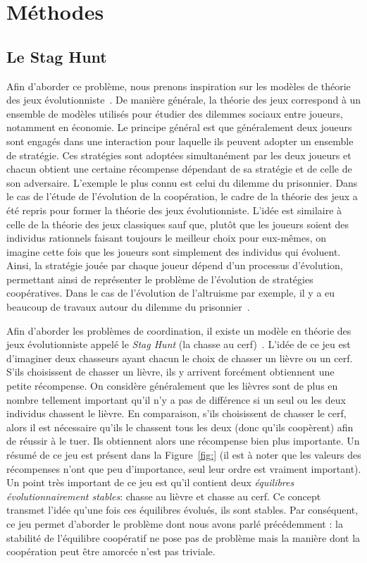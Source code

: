 \section{Méthodes}

	\subsection{Le Stag Hunt}

		Afin d'aborder ce problème, nous prenons inspiration sur les modèles de théorie des jeux évolutionniste~\parencite{MaynardSmith1973}. De manière générale, la théorie des jeux correspond à un ensemble de modèles utilisés pour étudier des dilemmes sociaux entre joueurs, notamment en économie. Le principe général est que généralement deux joueurs sont engagés dans une interaction pour laquelle ils peuvent adopter un ensemble de stratégie. Ces stratégies sont adoptées simultanément par les deux joueurs et chacun obtient une certaine récompense dépendant de sa stratégie et de celle de son adversaire. L'exemple le plus connu est celui du dilemme du prisonnier. Dans le cas de l'étude de l'évolution de la coopération, le cadre de la théorie des jeux a été repris pour former la théorie des jeux évolutionniste. L'idée est similaire à celle de la théorie des jeux classiques sauf que, plutôt que les joueurs soient des individus rationnels faisant toujours le meilleur choix pour eux-mêmes, on imagine cette fois que les joueurs sont simplement des individus qui évoluent. Ainsi, la stratégie jouée par chaque joueur dépend d'un processus d'évolution, permettant ainsi de représenter le problème de l'évolution de stratégies coopératives. Dans le cas de l'évolution de l'altruisme par exemple, il y a eu beaucoup de travaux autour du dilemme du prisonnier~\parencite{Axelrod1984}.

		Afin d'aborder les problèmes de coordination, il existe un modèle en théorie des jeux évolutionniste appelé le \emph{Stag Hunt} (la chasse au cerf)~\parencite{Skyrms2004}. L'idée de ce jeu est d'imaginer deux chasseurs ayant chacun le choix de chasser un lièvre ou un cerf. S'ils choisissent de chasser un lièvre, ils y arrivent forcément obtiennent une petite récompense. On considère généralement que les lièvres sont de plus en nombre tellement important qu'il n'y a pas de différence si un seul ou les deux individus chassent le lièvre. En comparaison, s'ils choisissent de chasser le cerf, alors il est nécessaire qu'ils le chassent tous les deux (donc qu'ils coopèrent) afin de réussir à le tuer. Ils obtiennent alors une récompense bien plus importante. Un résumé de ce jeu est présent dans la Figure~\ref{fig:} (il est à noter que les valeurs des récompenses n'ont que peu d'importance, seul leur ordre est vraiment important). Un point très important de ce jeu est qu'il contient deux \emph{équilibres évolutionnairement stables}: chasse au lièvre et chasse au cerf. Ce concept transmet l'idée qu'une fois ces équilibres évolués, ils sont stables. Par conséquent, ce jeu permet d'aborder le problème dont nous avons parlé précédemment : la stabilité de l'équilibre coopératif ne pose pas de problème mais la manière dont la coopération peut être amorcée n'est pas triviale.


